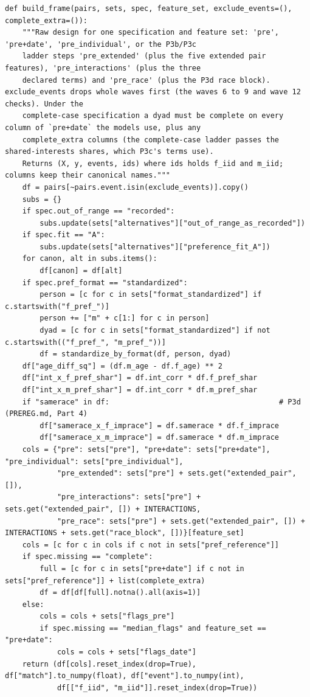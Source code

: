 \documentclass[11pt]{article}
\begin{document}
\begin{lstlisting}[caption={The raw design for one specification and feature set (scripts/modeling.py)}]
def build_frame(pairs, sets, spec, feature_set, exclude_events=(), complete_extra=()):
    """Raw design for one specification and feature set: 'pre', 'pre+date', 'pre_individual', or the P3b/P3c
    ladder steps 'pre_extended' (plus the five extended pair features), 'pre_interactions' (plus the three
    declared terms) and 'pre_race' (plus the P3d race block). exclude_events drops whole waves first (the waves 6 to 9 and wave 12 checks). Under the
    complete-case specification a dyad must be complete on every column of `pre+date` the models use, plus any
    complete_extra columns (the complete-case ladder passes the shared-interests shares, which P3c's terms use).
    Returns (X, y, events, ids) where ids holds f_iid and m_iid; columns keep their canonical names."""
    df = pairs[~pairs.event.isin(exclude_events)].copy()
    subs = {}
    if spec.out_of_range == "recorded":
        subs.update(sets["alternatives"]["out_of_range_as_recorded"])
    if spec.fit == "A":
        subs.update(sets["alternatives"]["preference_fit_A"])
    for canon, alt in subs.items():
        df[canon] = df[alt]
    if spec.pref_format == "standardized":
        person = [c for c in sets["format_standardized"] if c.startswith("f_pref_")]
        person += ["m" + c[1:] for c in person]
        dyad = [c for c in sets["format_standardized"] if not c.startswith(("f_pref_", "m_pref_"))]
        df = standardize_by_format(df, person, dyad)
    df["age_diff_sq"] = (df.m_age - df.f_age) ** 2
    df["int_x_f_pref_shar"] = df.int_corr * df.f_pref_shar
    df["int_x_m_pref_shar"] = df.int_corr * df.m_pref_shar
    if "samerace" in df:                                       # P3d (PREREG.md, Part 4)
        df["samerace_x_f_imprace"] = df.samerace * df.f_imprace
        df["samerace_x_m_imprace"] = df.samerace * df.m_imprace
    cols = {"pre": sets["pre"], "pre+date": sets["pre+date"], "pre_individual": sets["pre_individual"],
            "pre_extended": sets["pre"] + sets.get("extended_pair", []),
            "pre_interactions": sets["pre"] + sets.get("extended_pair", []) + INTERACTIONS,
            "pre_race": sets["pre"] + sets.get("extended_pair", []) + INTERACTIONS + sets.get("race_block", [])}[feature_set]
    cols = [c for c in cols if c not in sets["pref_reference"]]
    if spec.missing == "complete":
        full = [c for c in sets["pre+date"] if c not in sets["pref_reference"]] + list(complete_extra)
        df = df[df[full].notna().all(axis=1)]
    else:
        cols = cols + sets["flags_pre"]
        if spec.missing == "median_flags" and feature_set == "pre+date":
            cols = cols + sets["flags_date"]
    return (df[cols].reset_index(drop=True), df["match"].to_numpy(float), df["event"].to_numpy(int),
            df[["f_iid", "m_iid"]].reset_index(drop=True))
\end{lstlisting}
\end{document}
